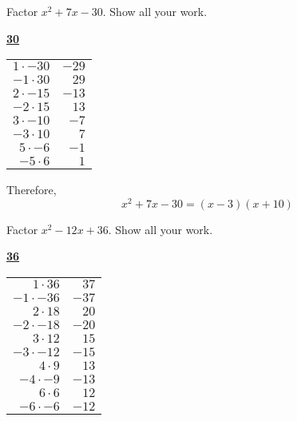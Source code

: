 \documentclass[11pt,letterpaper]{article}
\begin{document}

 Factor $x^2 + 7x - 30$. Show all your work. \pspace

\sol 
	\begin{table}[!ht]
	\centering
	\underline{\bfseries 30} \pvspace{0.2cm}
	\begin{tabular}{rr}
	$1 \cdot -30$ & $-29$ \\
	$-1 \cdot 30$ & $29$ \\
	$2 \cdot -15$ & $-13$ \\
	$-2 \cdot 15$ & $13$ \\
	$3 \cdot -10$ & $-7$ \\ \hline
	\multicolumn{1}{|r}{$-3 \cdot 10$} & \multicolumn{1}{r|}{$7$} \\ \hline
	$5 \cdot -6$ & $-1$ \\
	$-5 \cdot 6$ & $1$ 
	\end{tabular}
	\end{table}

Therefore,
	\[
	x^2 + 7x - 30= (x - 3)(x + 10)
	\]





\newpage





 Factor $x^2 - 12x + 36$. Show all your work. \pspace

\sol 
	\begin{table}[!ht]
	\centering
	\underline{\bfseries 36} \pvspace{0.2cm}
	\begin{tabular}{rr}
	$1 \cdot 36$ & $37$ \\
	$-1 \cdot -36$ & $-37$ \\
	$2 \cdot 18$ & $20$ \\
	$-2 \cdot -18$ & $-20$ \\
	$3 \cdot 12 $ & $15$ \\
	$-3 \cdot -12$ & $-15$ \\
	$4 \cdot 9$ & $13$ \\
	$-4 \cdot -9$ & $-13$ \\
	$6 \cdot 6$ & $12$ \\ \hline
	\multicolumn{1}{|r}{$-6 \cdot -6$} & \multicolumn{1}{r|}{$-12$} \\ \hline
	\end{tabular}
	\end{table}
\end{document}
